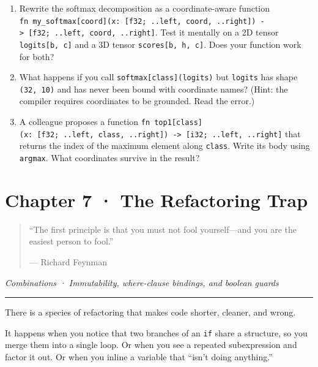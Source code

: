 \documentclass[11pt,]{article}
\begin{document}
\begin{enumerate}
\def\labelenumi{\arabic{enumi}.}
\item
  Rewrite the softmax decomposition as a coordinate-aware function
  \texttt{fn\ my\_softmax{[}coord{]}(x:\ {[}f32;\ ..left,\ coord,\ ..right{]})\ -\textgreater{}\ {[}f32;\ ..left,\ coord,\ ..right{]}}.
  Test it mentally on a 2D tensor \texttt{logits{[}b,\ c{]}} and a 3D
  tensor \texttt{scores{[}b,\ h,\ c{]}}. Does your function work for
  both?
\item
  What happens if you call \texttt{softmax{[}class{]}(logits)} but
  \texttt{logits} has shape \texttt{(32,\ 10)} and has never been bound
  with coordinate names? (Hint: the compiler requires coordinates to be
  grounded. Read the error.)
\item
  A colleague proposes a function
  \texttt{fn\ top1{[}class{]}(x:\ {[}f32;\ ..left,\ class,\ ..right{]})\ -\textgreater{}\ {[}i32;\ ..left,\ ..right{]}}
  that returns the index of the maximum element along \texttt{class}.
  Write its body using \texttt{argmax}. What coordinates survive in the
  result?
\end{enumerate}

\newpage

\hypertarget{chapter-7-the-refactoring-trap}{%
\section{Chapter 7 · The Refactoring
Trap}\label{chapter-7-the-refactoring-trap}}

\begin{quote}
``The first principle is that you must not fool yourself---and you are
the easiest person to fool.''

--- Richard Feynman
\end{quote}

\emph{Combinations · Immutability, where-clause bindings, and boolean
guards}

\begin{center}\rule{0.5\linewidth}{0.4pt}\end{center}

There is a species of refactoring that makes code shorter, cleaner, and
wrong.

It happens when you notice that two branches of an \texttt{if} share a
structure, so you merge them into a single loop. Or when you see a
repeated subexpression and factor it out. Or when you inline a variable
that ``isn't doing anything.''
\end{document}
